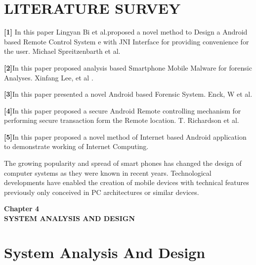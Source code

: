 \documentclass[12pt]{article}
\begin{document}
 \section{LITERATURE SURVEY}\par
\textbf{[1]} In this paper Lingyan Bi et al.proposed a novel method to Design a Android
based Remote Control System e with JNI Interface for providing convenience for
the user. Michael Spreitzenbarth et al.\par
\textbf{[2]}In this paper proposed analysis based Smartphone Mobile Malware for forensic
Analyses. Xinfang Lee, et al .\par
\textbf{[3]}In this paper presented a novel Android based Forensic System. Enck, W et al.\par
\textbf{[4]}In this paper proposed a secure Android Remote controlling mechanism for
performing secure transaction form the Remote location. T. Richardson et al.\par
\textbf{[5]}In this paper proposed a novel method of Internet based Android application
to demonstrate working of Internet Computing.\\[2mm]\par

The growing popularity and spread of smart phones has changed the design of
computer systems as they were known in recent years. Technological
developments have enabled the creation of mobile devices with technical features
previously only conceived in PC architectures or similar devices.


\clearpage





\begin{center}
 \LARGE \textbf {Chapter 4 }\\[10mm]
\Large \textbf{SYSTEM ANALYSIS AND DESIGN}\\[10mm]
 \end{center}

 \section{System Analysis And Design}
\end{document}
